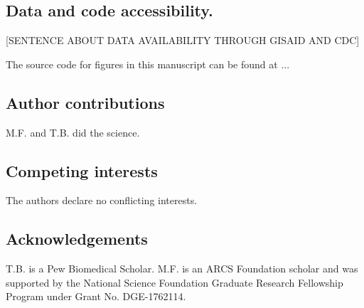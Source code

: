 \documentclass[12pt]{article}
\begin{document}
\subsection*{Data and code accessibility.}%

[SENTENCE ABOUT DATA AVAILABILITY THROUGH GISAID AND CDC]

The source code for figures in this manuscript can be found at ...

\subsection*{Author contributions}%

M.F. and T.B. did the science.

\subsection*{Competing interests}%

The authors declare no conflicting interests.

\subsection*{Acknowledgements}%
 
T.B. is a Pew Biomedical Scholar.
M.F. is an ARCS Foundation scholar and was supported by the National Science Foundation Graduate Research Fellowship Program under Grant No. DGE-1762114.
\end{document}
